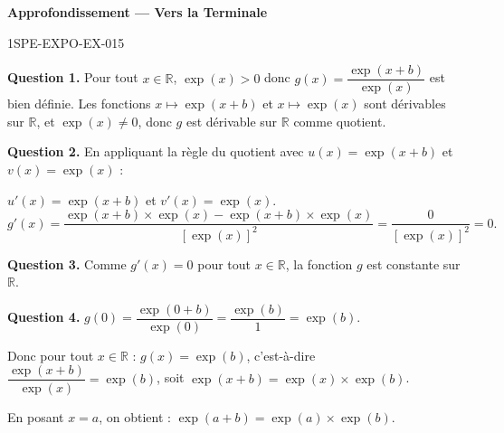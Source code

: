 \begin{center}\textbf{Approfondissement — Vers la Terminale}\end{center}
\begin{corrige}{1SPE-EXPO-EX-015}

\textbf{Question 1.} Pour tout $x \in \mathbb{R}$, $\exp(x) > 0$ donc $g(x) = \dfrac{\exp(x+b)}{\exp(x)}$ est bien définie. Les fonctions $x \mapsto \exp(x+b)$ et $x \mapsto \exp(x)$ sont dérivables sur $\mathbb{R}$, et $\exp(x)
\neq 0$, donc $g$ est dérivable sur $\mathbb{R}$ comme quotient.

\textbf{Question 2.} En appliquant la règle du quotient avec $u(x) = \exp(x+b)$ et $v(x) = \exp(x)$ :

$u'(x) = \exp(x+b)$ et $v'(x) = \exp(x)$.
\[
g'(x) = \frac{\exp(x+b) \times \exp(x) - \exp(x+b) \times \exp(x)}{[\exp(x)]^2} = \frac{0}{[\exp(x)]^2} = 0.
\]

\textbf{Question 3.} Comme $g'(x) = 0$ pour tout $x \in \mathbb{R}$, la fonction $g$ est constante sur $\mathbb{R}$.

\textbf{Question 4.} $g(0) = \dfrac{\exp(0+b)}{\exp(0)} = \dfrac{\exp(b)}{1} = \exp(b)$.

Donc pour tout $x \in \mathbb{R}$ : $g(x) = \exp(b)$, c'est-à-dire $\dfrac{\exp(x+b)}{\exp(x)} = \exp(b)$, soit $\exp(x+b) = \exp(x) \times \exp(b)$.

En posant $x = a$, on obtient : $\exp(a+b) = \exp(a) \times \exp(b)$.
\end{corrige}
